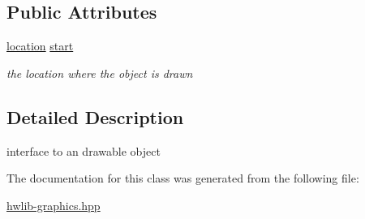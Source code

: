 \subsection*{Public Attributes}
\begin{DoxyCompactItemize}
\item 
\hyperlink{classhwlib_1_1location}{location} \hyperlink{classhwlib_1_1drawable_a6c31bc9303840a4317d3c95250c357ce}{start}\hypertarget{classhwlib_1_1drawable_a6c31bc9303840a4317d3c95250c357ce}{}\label{classhwlib_1_1drawable_a6c31bc9303840a4317d3c95250c357ce}

\begin{DoxyCompactList}\small\item\em the location where the object is drawn \end{DoxyCompactList}\end{DoxyCompactItemize}


\subsection{Detailed Description}
interface to an drawable object 

The documentation for this class was generated from the following file\+:\begin{DoxyCompactItemize}
\item 
\hyperlink{hwlib-graphics_8hpp}{hwlib-\/graphics.\+hpp}\end{DoxyCompactItemize}
